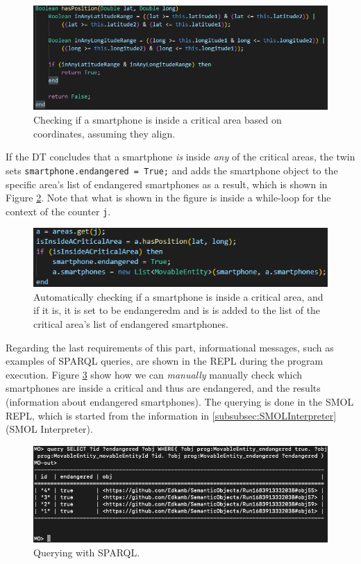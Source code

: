 \documentclass{article}
\begin{document}
\begin{figure}[H]
    \centering
    \includegraphics[scale=0.64]{graphics/inside_critical_area.png}
    \caption{Checking if a smartphone is inside a critical area based on coordinates, assuming they align.}
    \label{fig:inside_critical_area}
\end{figure}

If the DT concludes that a smartphone \emph{is} inside \emph{any} of the critical areas, the twin sets \verb|smartphone.endangered = True;| and adds the smartphone object to the specific area's list of endangered smartphones as a result, which is shown in Figure \ref{fig:add_endangered}. Note that what is shown in the figure is inside a while-loop for the context of the counter \verb|j|.

\begin{figure}[H]
    \centering
    \includegraphics[scale=0.80]{graphics/add_endangered.png}
    \caption{Automatically checking if a smartphone is inside a critical area, and if it is, it is set to be endangeredm and is is added to the list of the critical area's list of endangered smartphones.}
    \label{fig:add_endangered}
\end{figure}

Regarding the last requirements of this part, informational messages, such as examples of SPARQL queries, are shown in the REPL during the program execution. Figure \ref{fig:sparql_smol} show how we can \emph{manually} manually check which smartphones are inside a critical and thus are endangered, and the results (information about endangered smartphones). The querying is done in the SMOL REPL, which is started from the information in \ref{subsubsec:SMOLInterpreter}(SMOL Interpreter).

\begin{figure}[H]
    \centering
    \includegraphics[scale=0.44]{graphics/sparql_smol}
    \caption{Querying with SPARQL.}
    \label{fig:sparql_smol}
\end{figure}
\end{document}
